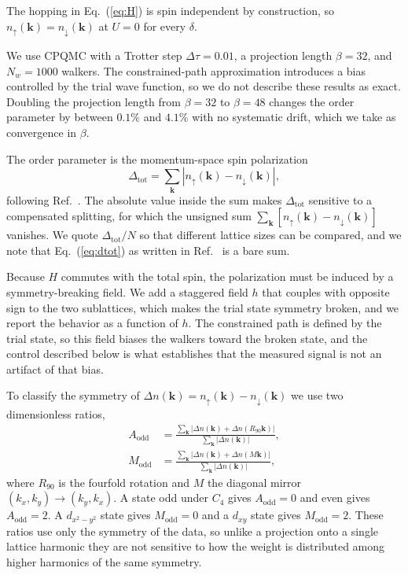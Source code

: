 \documentclass[aps,prl,reprint,superscriptaddress,amsmath,amssymb,floatfix]{revtex4-2}
\begin{document}
The hopping in Eq.~(\ref{eq:H}) is spin independent by construction, so
$n_{\uparrow}(\bm{k}) = n_{\downarrow}(\bm{k})$ at $U = 0$ for every $\delta$.

We use CPQMC with a Trotter step $\Delta\tau = 0.01$, a projection length
$\beta = 32$, and $N_w = 1000$ walkers. The constrained-path approximation
introduces a bias controlled by the trial wave function, so we do not describe
these results as exact. Doubling the projection length from $\beta = 32$ to
$\beta = 48$ changes the order parameter by between $0.1\%$ and $4.1\%$ with no
systematic drift, which we take as convergence in $\beta$.

The order parameter is the momentum-space spin polarization
\begin{equation}
\Delta_{\mathrm{tot}} = \sum_{\bm{k}} \left| n_{\uparrow}(\bm{k}) - n_{\downarrow}(\bm{k}) \right|,
\label{eq:dtot}
\end{equation}
following Ref.~\cite{OurPRB}. The absolute value inside the sum makes
$\Delta_{\mathrm{tot}}$ sensitive to a compensated splitting, for which the
unsigned sum $\sum_{\bm{k}} [n_{\uparrow}(\bm{k}) - n_{\downarrow}(\bm{k})]$
vanishes. We quote $\Delta_{\mathrm{tot}}/N$ so that different lattice sizes can
be compared, and we note that Eq.~(\ref{eq:dtot}) as written in
Ref.~\cite{OurPRB} is a bare sum.

Because $H$ commutes with the total spin, the polarization must be induced by a
symmetry-breaking field. We add a staggered field $h$ that couples with opposite
sign to the two sublattices, which makes the trial state symmetry broken, and we
report the behavior as a function of $h$. The constrained path is defined by the
trial state, so this field biases the walkers toward the broken state, and the
control described below is what establishes that the measured signal is not an
artifact of that bias.

To classify the symmetry of $\Delta n(\bm{k}) = n_{\uparrow}(\bm{k}) - n_{\downarrow}(\bm{k})$
we use two dimensionless ratios,
\begin{align}
A_{\mathrm{odd}} &= \frac{\sum_{\bm{k}} \left| \Delta n(\bm{k}) + \Delta n(R_{90}\bm{k}) \right|}
                         {\sum_{\bm{k}} \left| \Delta n(\bm{k}) \right|},
\label{eq:aodd}\\
M_{\mathrm{odd}} &= \frac{\sum_{\bm{k}} \left| \Delta n(\bm{k}) + \Delta n(M\bm{k}) \right|}
                         {\sum_{\bm{k}} \left| \Delta n(\bm{k}) \right|},
\label{eq:modd}
\end{align}
where $R_{90}$ is the fourfold rotation and $M$ the diagonal mirror
$(k_x,k_y) \to (k_y,k_x)$. A state odd under $C_4$ gives
$A_{\mathrm{odd}} = 0$ and even gives $A_{\mathrm{odd}} = 2$. A $d_{x^2-y^2}$
state gives $M_{\mathrm{odd}} = 0$ and a $d_{xy}$ state gives
$M_{\mathrm{odd}} = 2$. These ratios use only the symmetry of the data, so
unlike a projection onto a single lattice harmonic they are not sensitive to
how the weight is distributed among higher harmonics of the same symmetry.
\end{document}
